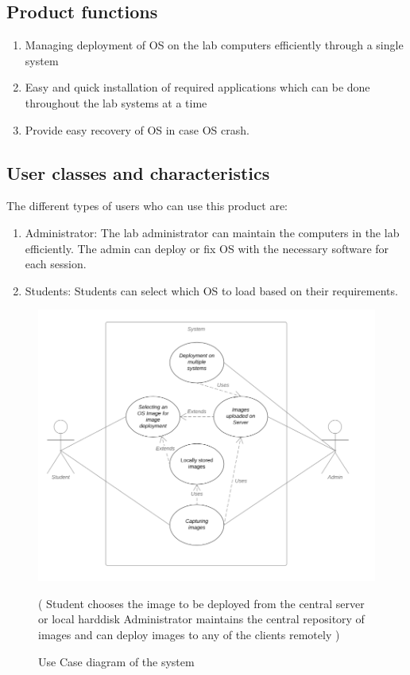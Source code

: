 \documentclass[a4paper,12pt]{article}
\begin{document}
\subsection{Product functions}
\begin{enumerate}
    \item Managing deployment of OS on the lab computers efficiently through a single system
    \item Easy and quick installation of required applications which can be done throughout the lab systems at a time
    \item Provide easy recovery of OS in case OS crash.
\end{enumerate}
\subsection{User classes and characteristics}
The different types of users who can use this product are:
\begin{enumerate}
    \item Administrator: The lab administrator can maintain the computers in the lab efficiently. The admin can deploy or fix OS with the necessary software for each session.
    \item Students: Students can select which OS to load based on their requirements. 
    
\end{enumerate}
\begin{figure}[h!]
    \centering
    \includegraphics[width=\linewidth]{i1.png}
    \caption{Use Case diagram of the system}
    \label{fig:Use case}
    \small
    ( Student chooses the image to be deployed from the central server or local harddisk
    Administrator maintains the central repository of images and can deploy
    images to any of the clients remotely )
\end{figure}
\end{document}
